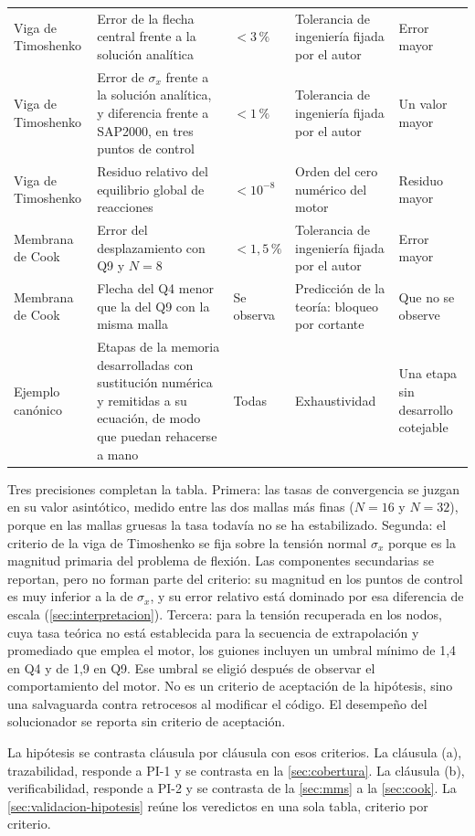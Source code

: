 {\begin{longtable}{@{}>{\raggedright\arraybackslash}p{2.3cm}>{\raggedright\arraybackslash}p{3.6cm}>{\raggedright\arraybackslash}p{2.6cm}>{\raggedright\arraybackslash}p{3.0cm}>{\raggedright\arraybackslash}p{2.3cm}@{}}
Viga de Timoshenko & Error de la flecha central frente a la solución analítica & $< 3\,\%$ & Tolerancia de ingeniería fijada por el autor & Error mayor \\
Viga de Timoshenko & Error de $\sigma_x$ frente a la solución analítica, y diferencia frente a SAP2000, en tres puntos de control & $< 1\,\%$ & Tolerancia de ingeniería fijada por el autor & Un valor mayor \\
Viga de Timoshenko & Residuo relativo del equilibrio global de reacciones & $< 10^{-8}$ & Orden del cero numérico del motor & Residuo mayor \\
Membrana de Cook & Error del desplazamiento con Q9 y $N=8$ & $< 1{,}5\,\%$ & Tolerancia de ingeniería fijada por el autor & Error mayor \\
Membrana de Cook & Flecha del Q4 menor que la del Q9 con la misma malla & Se observa & Predicción de la teoría: bloqueo por cortante & Que no se observe \\
Ejemplo canónico & Etapas de la memoria desarrolladas con sustitución numérica y remitidas a su ecuación, de modo que puedan rehacerse a mano & Todas & Exhaustividad & Una etapa sin desarrollo cotejable \\
\end{longtable}}

Tres precisiones completan la tabla. Primera: las tasas de convergencia se juzgan en su valor asintótico, medido entre las dos mallas más finas ($N=16$ y $N=32$), porque en las mallas gruesas la tasa todavía no se ha estabilizado. Segunda: el criterio de la viga de Timoshenko se fija sobre la tensión normal $\sigma_x$ porque es la magnitud primaria del problema de flexión. Las componentes secundarias se reportan, pero no forman parte del criterio: su magnitud en los puntos de control es muy inferior a la de $\sigma_x$, y su error relativo está dominado por esa diferencia de escala (\autoref{sec:interpretacion}). Tercera: para la tensión recuperada en los nodos, cuya tasa teórica no está establecida para la secuencia de extrapolación y promediado que emplea el motor, los guiones incluyen un umbral mínimo de 1,4 en Q4 y de 1,9 en Q9. Ese umbral se eligió después de observar el comportamiento del motor. No es un criterio de aceptación de la hipótesis, sino una salvaguarda contra retrocesos al modificar el código. El desempeño del solucionador se reporta sin criterio de aceptación.

La hipótesis se contrasta cláusula por cláusula con esos criterios. La cláusula (a), trazabilidad, responde a PI-1 y se contrasta en la \autoref{sec:cobertura}. La cláusula (b), verificabilidad, responde a PI-2 y se contrasta de la \autoref{sec:mms} a la \autoref{sec:cook}. La \autoref{sec:validacion-hipotesis} reúne los veredictos en una sola tabla, criterio por criterio.
